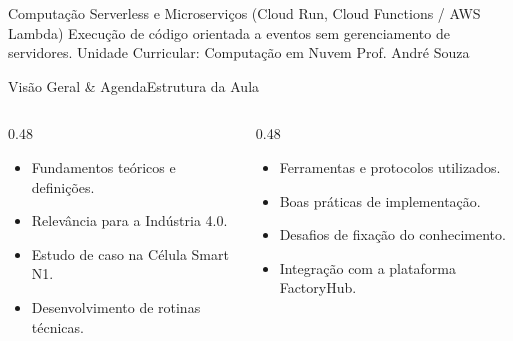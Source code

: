 
\senaicover
  {Computação Serverless e Microserviços (Cloud Run, Cloud Functions / AWS Lambda)}
  {Execução de código orientada a eventos sem gerenciamento de servidores.}
  {Unidade Curricular: Computação em Nuvem}
  {Prof. André Souza}

\begin{senaiframe}{Visão Geral \& Agenda}{Estrutura da Aula}
  \begin{columns}[t]
    \begin{column}{0.48\textwidth}
      \begin{tcolorbox}[senaibluecard, title={1. Conceitos Chave}]
        \begin{itemize}
          \item Fundamentos teóricos e definições.
          \item Relevância para a Indústria 4.0.
        \end{itemize}
      \end{tcolorbox}
      \vspace{4pt}
      \begin{tcolorbox}[senaiambercard, title={3. Aplicação Prática}]
        \begin{itemize}
          \item Estudo de caso na Célula Smart N1.
          \item Desenvolvimento de rotinas técnicas.
        \end{itemize}
      \end{tcolorbox}
    \end{column}
    \begin{column}{0.48\textwidth}
      \begin{tcolorbox}[senairedcard, title={2. Detalhamento Técnico}]
        \begin{itemize}
          \item Ferramentas e protocolos utilizados.
          \item Boas práticas de implementação.
        \end{itemize}
      \end{tcolorbox}
      \vspace{4pt}
      \begin{tcolorbox}[senaigreencard, title={4. Exercícios \& Avaliação}]
        \begin{itemize}
          \item Desafios de fixação do conhecimento.
          \item Integração com a plataforma FactoryHub.
        \end{itemize}
      \end{tcolorbox}
    \end{column}
  \end{columns}
\end{senaiframe}

